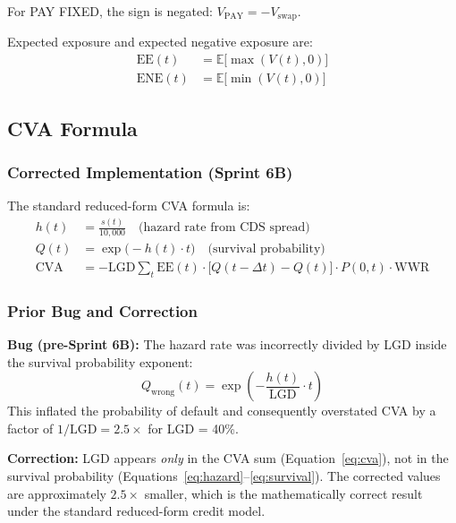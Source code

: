 \documentclass[11pt,a4paper]{article}
\begin{document}
For PAY FIXED, the sign is negated: $V_\text{PAY} = -V_\text{swap}$.

Expected exposure and expected negative exposure are:
\begin{align}
  \text{EE}(t)  &= \mathbb{E}\bigl[\max(V(t), 0)\bigr] \\
  \text{ENE}(t) &= \mathbb{E}\bigl[\min(V(t), 0)\bigr]
\end{align}

\subsection{CVA Formula}
\label{sec:cva-fix}

\subsubsection{Corrected Implementation (Sprint 6B)}

The standard reduced-form CVA formula is:
\begin{align}
  h(t) &= \frac{s(t)}{10{,}000} \quad \text{(hazard rate from CDS spread)} \label{eq:hazard} \\
  Q(t) &= \exp\bigl(-h(t) \cdot t\bigr) \quad \text{(survival probability)} \label{eq:survival} \\
  \text{CVA} &= -\text{LGD} \sum_{t} \text{EE}(t) \cdot \bigl[Q(t-\Delta t) - Q(t)\bigr] \cdot P(0,t) \cdot \text{WWR}
  \label{eq:cva}
\end{align}

\subsubsection{Prior Bug and Correction}

\noindent\colorbox{red!8}{\parbox{\dimexpr\textwidth-2\fboxsep}{
\textbf{Bug (pre-Sprint 6B):} The hazard rate was incorrectly divided by LGD
inside the survival probability exponent:
$$
Q_\text{wrong}(t) = \exp\!\left(-\frac{h(t)}{\text{LGD}} \cdot t\right)
$$
This inflated the probability of default and consequently overstated CVA by a factor
of $1/\text{LGD} = 2.5\times$ for LGD = 40\%.
}}

\vspace{0.5em}

\noindent\colorbox{lightteal}{\parbox{\dimexpr\textwidth-2\fboxsep}{
\textbf{Correction:} LGD appears \emph{only} in the CVA sum
(Equation~\ref{eq:cva}), not in the survival probability
(Equations~\ref{eq:hazard}--\ref{eq:survival}).
The corrected values are approximately $2.5\times$ smaller, which is the
mathematically correct result under the standard reduced-form credit model.
}}
\end{document}

